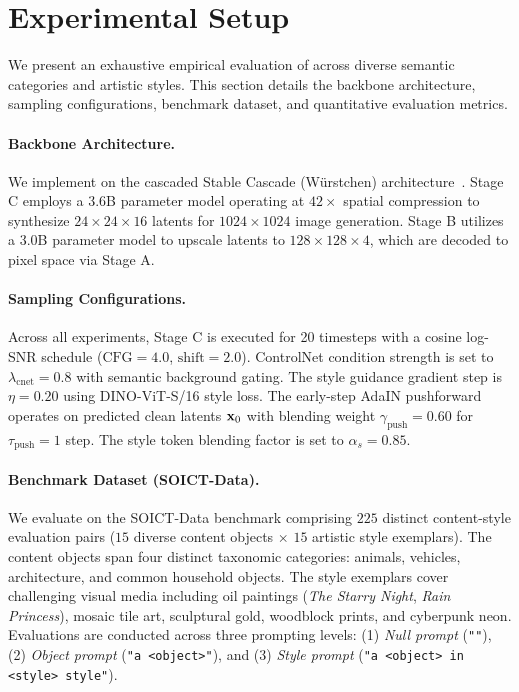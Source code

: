 \section{Experimental Setup}
\label{sec:setup}

We present an exhaustive empirical evaluation of \method across diverse semantic categories and artistic styles. This section details the backbone architecture, sampling configurations, benchmark dataset, and quantitative evaluation metrics.

\paragraph{Backbone Architecture.}
We implement \method on the cascaded Stable Cascade (W{\"u}rstchen) architecture~\cite{wuerstchen}. Stage C employs a 3.6B parameter model operating at $42\times$ spatial compression to synthesize $24 \times 24 \times 16$ latents for $1024 \times 1024$ image generation. Stage B utilizes a 3.0B parameter model to upscale latents to $128 \times 128 \times 4$, which are decoded to pixel space via Stage A.

\paragraph{Sampling Configurations.}
Across all experiments, Stage C is executed for 20 timesteps with a cosine log-SNR schedule ($\text{CFG} = 4.0$, $\text{shift} = 2.0$). ControlNet condition strength is set to $\lambda_{\text{cnet}} = 0.8$ with semantic background gating. The style guidance gradient step is $\eta = 0.20$ using DINO-ViT-S/16 style loss. The early-step AdaIN pushforward operates on predicted clean latents $\mathbf{x}_0$ with blending weight $\gamma_{\text{push}} = 0.60$ for $\tau_{\text{push}} = 1$ step. The style token blending factor is set to $\alpha_s = 0.85$.

\paragraph{Benchmark Dataset (SOICT-Data).}
We evaluate on the SOICT-Data benchmark comprising $225$ distinct content-style evaluation pairs ($15$ diverse content objects $\times$ $15$ artistic style exemplars). The content objects span four distinct taxonomic categories: animals, vehicles, architecture, and common household objects. The style exemplars cover challenging visual media including oil paintings (\textit{The Starry Night}, \textit{Rain Princess}), mosaic tile art, sculptural gold, woodblock prints, and cyberpunk neon. Evaluations are conducted across three prompting levels: (1) \textit{Null prompt} (\texttt{""}), (2) \textit{Object prompt} (\texttt{"a <object>"}), and (3) \textit{Style prompt} (\texttt{"a <object> in <style> style"}).


